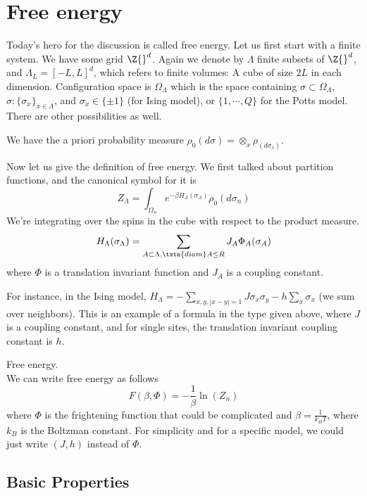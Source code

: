 

\section{Free energy}

Today's hero for the discussion is called free energy. Let us first start with a finite system. We have some grid $\Z{}^d$. Again we denote by $\Lambda$ finite subsets of $\Z{}^d$, and $\Lambda_L = [-L, L]^d$, which refers to finite volumes: A cube of size $2L$ in each dimension. Configuration space is $\Omega_{\Lambda}$ which is the space containing $\sigma \subset \Omega_{\Lambda}$, $\sigma: \{\sigma_x\}_{x \in \Lambda}$, and $\sigma_x \in \{\pm 1\}$ (for Ising model), or $\{1, \cdots, Q\}$ for the Potts model. There are other possibilities as well. 

We have the a priori probability measure $\rho_0(d\sigma) = \otimes_x \rho_(d\sigma_x)$. 

Now let us give the definition of free energy. We first talked about partition functions, and the canonical symbol for it is 
\[
Z_{\Lambda} = \int_{\Omega_n} e^{-\beta H_{\Lambda}(\sigma_{\Lambda})}\rho_0(d\sigma_n)
\]
We're integrating over the spins in the cube with respect to the product measure. 
\[
H_{\Lambda}(\sigma_{\Lambda}) = \sum_{A \subset \Lambda, \txtn{diam} A \leq R} J_A \Phi_{A}(\sigma_A)
\]
where $\Phi$ is a translation invariant function and $J_A$ is a coupling constant.  

For instance, in the Ising model, $H_{\Lambda} = -\sum_{x, y, |x - y| = 1} J \sigma_x\sigma_y - h\sum_x \sigma_x$ (we sum over neighbors). This is an example of a formula in the type given above, where $J$ is a coupling constant, and for single sites, the translation invariant coupling constant is $h$.  

\begin{df} Free energy. \\
We can write free energy as follows
\[
F(\beta, \Phi) = -\frac{1}{\beta}\ln(Z_n)
\]
where $\Phi$ is the frightening function that could be complicated and $\beta = \frac{1}{k_{B}T}$, where $k_{B}$ is the Boltzman constant. For simplicity and for a specific model, we could just write $(J, h)$ instead of $\Phi$. 
\end{df}

\subsection{Basic Properties}

